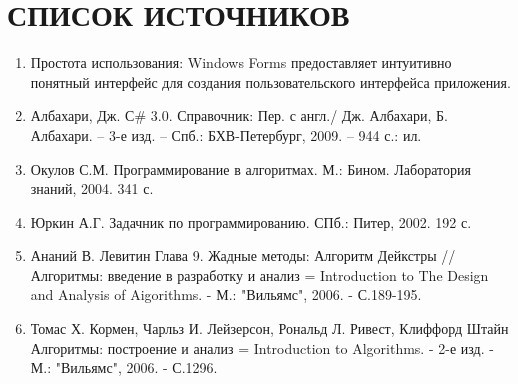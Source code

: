 \documentclass[a4paper,14pt, Times New Roman]{extarticle}
\begin{document}
\newpage
\section{СПИСОК ИСТОЧНИКОВ}

\begin{enumerate}
  \item Простота использования: Windows Forms предоставляет интуитивно понятный интерфейс для создания пользовательского интерфейса приложения.
  \item Албахари, Дж. С\# 3.0. Справочник: Пер. с англ./ Дж. Албахари,  Б. Албахари. – 3-е изд. – Спб.: БХВ-Петербург, 2009. – 944 с.: ил.
  \item Окулов С.М. Программирование в алгоритмах. М.: Бином. Лаборатория знаний, 2004. 341 с.
  \item Юркин А.Г. Задачник по программированию. СПб.: Питер, 2002. 192 с.
  \item Ананий В. Левитин Глава 9. Жадные методы: Алгоритм Дейкстры // Алгоритмы: введение в разработку и анализ = Introduction to The Design and Analysis of Aigorithms. - М.: "Вильямс", 2006. - С.189-195.
  \item Томас Х. Кормен, Чарльз И. Лейзерсон, Рональд Л. Ривест, Клиффорд Штайн Алгоритмы: построение и анализ = Introduction to Algorithms. - 2-е изд. - М.: "Вильямс", 2006. - С.1296.
\end{enumerate}
\end{document}

